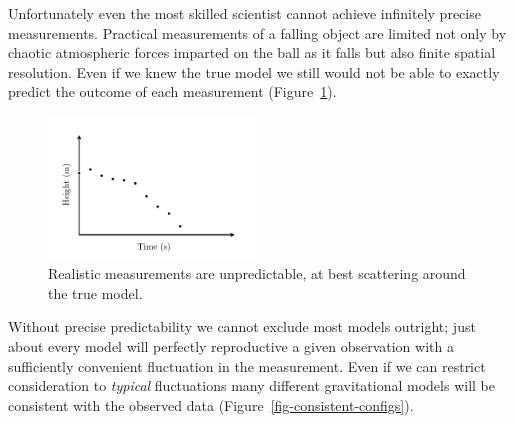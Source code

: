 \documentclass[
  letterpaper,
  DIV=11,
  numbers=noendperiod]{scrartcl}
\begin{document}
Unfortunately even the most skilled scientist cannot achieve infinitely
precise measurements. Practical measurements of a falling object are
limited not only by chaotic atmospheric forces imparted on the ball as
it falls but also finite spatial resolution. Even if we knew the true
model we still would not be able to exactly predict the outcome of each
measurement (Figure~\ref{fig-realistic-data}).

\begin{figure}

{\centering \includegraphics[width=0.5\textwidth,height=\textheight]{figures/gravity/data/data.pdf}

}

\caption{\label{fig-realistic-data}Realistic measurements are
unpredictable, at best scattering around the true model.}

\end{figure}

Without precise predictability we cannot exclude most models outright;
just about every model will perfectly reproductive a given observation
with a sufficiently convenient fluctuation in the measurement. Even if
we can restrict consideration to \emph{typical} fluctuations many
different gravitational models will be consistent with the observed data
(Figure~\ref{fig-consistent-configs}).
\end{document}
